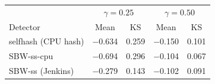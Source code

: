\begin{tabular}{@{}l|cc|cc@{}}
\toprule
& \multicolumn{2}{c|}{$\gamma=0.25$} & \multicolumn{2}{c}{$\gamma=0.50$} \\
Detector & Mean & KS & Mean & KS \\
\midrule
selfhash (CPU hash) & $-$0.634 & 0.259 & $-$0.150 & 0.101 \\
SBW-ss-cpu & $-$0.694 & 0.296 & $-$0.104 & 0.067 \\
SBW-ss (Jenkins) & $-$0.279 & 0.143 & $-$0.102 & 0.091 \\
\bottomrule
\end{tabular}
